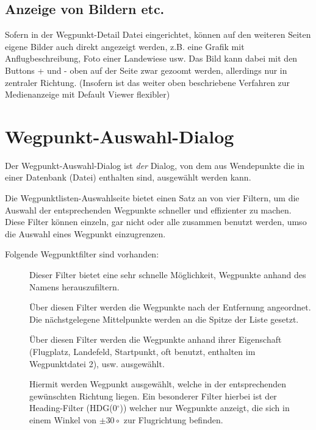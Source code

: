 \subsection*{Anzeige von Bildern etc.}
Sofern in der Wegpunkt-Detail Datei eingerichtet, können auf den weiteren Seiten eigene Bilder auch direkt angezeigt werden, z.B. eine Grafik mit Anflugbeschreibung, Foto einer Landewiese usw. Das Bild kann dabei mit den Buttons + und - oben auf der Seite zwar gezoomt werden, allerdings nur in zentraler Richtung. (Insofern ist das weiter oben beschriebene Verfahren zur Medienanzeige mit Default Viewer flexibler)


\section{Wegpunkt-Auswahl-Dialog}\label{sec:waypoint-selector-dialog}
Der Wegpunkt-Auswahl-Dialog ist \textsl{der} Dialog, von dem aus Wendepunkte die in einer Datenbank (Datei) enthalten sind, ausgewählt werden kann.

Die Wegpunktlisten-Auswahlseite bietet einen Satz an von vier Filtern, um die Auswahl der entsprechenden  Wegpunkte schneller und effizienter zu machen. Diese Filter können einzeln, gar nicht oder alle zusammen benutzt werden, umso die Auswahl eines Wegpunkt  einzugrenzen.

Folgende Wegpunktfilter sind vorhanden:

\begin{description}
\item[] Dieser Filter bietet eine sehr schnelle Möglichkeit, Wegpunkte anhand des Namens herauszufiltern.
\item[] Über diesen Filter werden die Wegpunkte nach der Entfernung angeordnet. Die nächstgelegene 
Mittelpunkte werden an die Spitze der Liste gesetzt.
\item[] Über diesen Filter werden die Wegpunkte anhand ihrer Eigenschaft (Flugplatz, Landefeld, Startpunkt, oft benutzt, enthalten im Wegpunktdatei 2), usw. ausgewählt.
\item[] Hiermit werden Wegpunkt ausgewählt, welche in der entsprechenden gewünschten Richtung liegen. Ein besonderer Filter hierbei ist der Heading-Filter (\textsf{HDG(0$^\circ$)}) welcher nur Wegpunkte anzeigt, die sich in einem Winkel von $\pm 30\circ$ zur Flugrichtung befinden.
\end{description}

